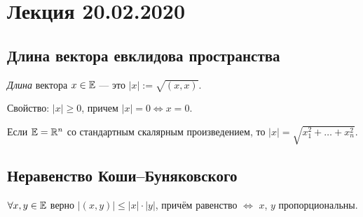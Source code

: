 \section{Лекция 20.02.2020}


\begin{comment}
    Всякое подпространство $U \subseteq E$ тоже является евклидовым пространством со скалярным произведением $(\bigcdot, \bigcdot) \big|_U \leftarrow$ ограничение на $U$.
\end{comment}


\subsection{Длина вектора евклидова пространства}

\begin{definition}
    \textit{Длина} вектора $x \in \mathbb{E}$ --- это $|x| := \sqrt{(x, x)}$.

    Свойство: 
    $|x| \geq 0$, причем $|x| = 0 \iff x = 0$.
\end{definition}

\begin{example}
    Если $\mathbb{E} = \mathbb{R}^n$ со стандартным скалярным произведением, то $|x| = \sqrt{x_1^2 + \dots + x_n^2}$.
\end{example}

\begin{comment}
    Если $\EE = \text{Mat}_{m \times n}(\RR)$, $(A, B) = \tr(A^{T} B)$

    Тогда, $|A| = \sqrt{\sum_{i = 1}^{m} \sum_{j = 1}^{n} a_{ij}^2} \leftarrow$ это обозначается как $\norm{A}_{F}$ и называется \textit{нормой Фробениуса}, \textit{фробениусовой нормой}.
\end{comment}


\subsection{Неравенство Коши–Буняковского}

\begin{proposal}
    $\forall x, y \in \mathbb{E}$ верно $|(x, y)| \leq |x| \cdot |y|$, причём равенство $\iff$ $x$, $y$ пропорциональны.
\end{proposal}

